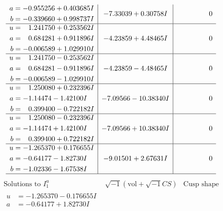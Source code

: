 \documentclass[1p]{elsarticle_modified}
\theoremstyle{definition}
\newcommand{\I}{\sqrt{-1}}
\begin{document}
$$\begin{array}{c|c|c}
\begin{aligned}
a &= -0.955256 + 0.403685 I \\
b &= -0.339660 + 0.998737 I\end{aligned}
 & -7.33039 + 0.30758 I & \phantom{-0.000000 } 0 \\ \hline\begin{aligned}
u &= \phantom{-}1.241750 + 0.253562 I \\
a &= \phantom{-}0.684281 + 0.911896 I \\
b &= -0.006589 + 1.029910 I\end{aligned}
 & -4.23859 + 4.48465 I & \phantom{-0.000000 } 0 \\ \hline\begin{aligned}
u &= \phantom{-}1.241750 - 0.253562 I \\
a &= \phantom{-}0.684281 - 0.911896 I \\
b &= -0.006589 - 1.029910 I\end{aligned}
 & -4.23859 - 4.48465 I & \phantom{-0.000000 } 0 \\ \hline\begin{aligned}
u &= \phantom{-}1.250080 + 0.232396 I \\
a &= -1.14474 - 1.42100 I \\
b &= \phantom{-}0.399400 - 0.722182 I\end{aligned}
 & -7.09566 - 10.38340 I & \phantom{-0.000000 } 0 \\ \hline\begin{aligned}
u &= \phantom{-}1.250080 - 0.232396 I \\
a &= -1.14474 + 1.42100 I \\
b &= \phantom{-}0.399400 + 0.722182 I\end{aligned}
 & -7.09566 + 10.38340 I & \phantom{-0.000000 } 0 \\ \hline\begin{aligned}
u &= -1.265370 + 0.176655 I \\
a &= -0.64177 - 1.82730 I \\
b &= -1.02336 - 1.67538 I\end{aligned}
 & -9.01501 + 2.67631 I & \phantom{-0.000000 } 0\\
 \hline 
 \end{array}$$\newpage$$\begin{array}{c|c|c}  
\text{Solutions to }I^u_{1}& \I (\text{vol} + \sqrt{-1}CS) & \text{Cusp shape}\\
 \hline 
\begin{aligned}
u &= -1.265370 - 0.176655 I \\
a &= -0.64177 + 1.82730 I \\

\end{aligned}
\end{array}$$
\end{document}
